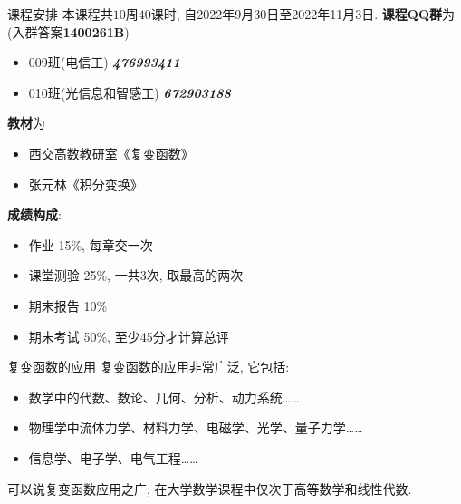 \begin{frame}{课程安排}
\onslide<+->
本课程共$10$周$40$课时,
\onslide<+->
自2022年9月30日至2022年11月3日.
\onslide<+->
\textbf{课程QQ群}为 (入群答案\textbf{1400261B})
\begin{itemize}[<*>]
\item 009班(电信工) \emph{\textbf{476993411}}
\item 010班(光信息和智感工) \emph{\textbf{672903188}}
\end{itemize}

\onslide<+->
\textbf{教材}为
\begin{itemize}[<*>]
\item 西交高数教研室《复变函数》
\item 张元林《积分变换》
\end{itemize}

\onslide<+->
\textbf{成绩构成}:
\begin{itemize}
\item 作业 15\%, 每章交一次
\item 课堂测验 25\%, 一共3次, 取最高的两次
\item 期末报告 10\%
\item 期末考试 50\%, 至少45分才计算总评
\end{itemize}
\end{frame}


\begin{frame}{复变函数的应用}
\onslide<+->
复变函数的应用非常广泛, 它包括:
\begin{itemize}
\item 数学中的代数、数论、几何、分析、动力系统……
\item 物理学中流体力学、材料力学、电磁学、光学、量子力学……
\item 信息学、电子学、电气工程……
\end{itemize}
\onslide<+->
可以说复变函数应用之广, 在大学数学课程中仅次于高等数学和线性代数.
\end{frame}


